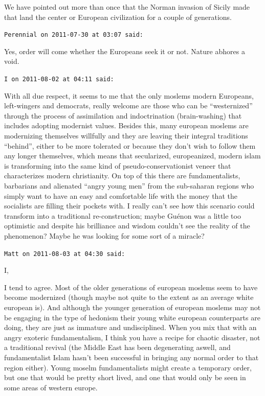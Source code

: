 \begin{footnotesize}
\begin{sffamily}
We have pointed out more than once that the Norman invasion of Sicily made that land the center or European civilization for a couple of generations.

\hfill

\texttt{Perennial on 2011-07-30 at 03:07 said:}

Yes, order will come whether the Europeans seek it or not. Nature abhores a void.

\hfill

\texttt{I on 2011-08-02 at 04:11 said:}

With all due respect, it seems to me that the only moslems modern Europeans, left-wingers and democrats, really welcome are those who can be ``westernized'' through the process of assimilation and indoctrination (brain-washing) that includes adopting modernist values. Besides this, many european moslems are modernizing themselves willfully and they are leaving their integral traditions ``behind'', either to be more tolerated or because they don't wish to follow them any longer themselves, which means that secularized, europeanized, modern islam is transforming into the same kind of pseudo-conservationist veneer that characterizes modern christianity. On top of this there are fundamentalists, barbarians and alienated ``angry young men'' from the sub-saharan regions who simply want to have an easy and comfortable life with the money that the socialists are filling their pockets with. I really can't see how this scenario could transform into a traditional re-construction; maybe Guénon was a little too optimistic and despite his brilliance and wisdom couldn't see the reality of the phenomenon? Maybe he was looking for some sort of a miracle?

\hfill

\texttt{Matt on 2011-08-03 at 04:30 said:}

I,

I tend to agree. Most of the older generations of european moslems seem to have become modernized (though maybe not quite to the extent as an average white european is). And although the younger generation of european moslems may not be engaging in the type of hedonism their young white european counterparts are doing, they are just as immature and undisciplined. When you mix that with an angry exoteric fundamentalism, I think you have a recipe for chaotic disaster, not a traditional revival (the Middle East has been degenerating aswell, and fundamentalist Islam hasn't been successful in bringing any normal order to that region either). Young moselm fundamentalists might create a temporary order, but one that would be pretty short lived, and one that would only be seen in some areas of western europe.


\end{sffamily}
\end{footnotesize}
